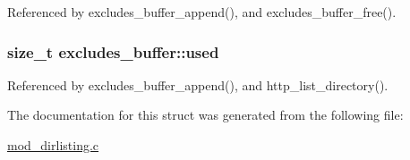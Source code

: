 Referenced by excludes\-\_\-buffer\-\_\-append(), and excludes\-\_\-buffer\-\_\-free().

\hypertarget{structexcludes__buffer_ab9bca0c4a6ef3bd0908c0f3c22632576}{
\subsubsection[{used}]{\setlength{\rightskip}{0pt plus 5cm}size\-\_\-t excludes\-\_\-buffer\-::used}}\label{structexcludes__buffer_ab9bca0c4a6ef3bd0908c0f3c22632576}


Referenced by excludes\-\_\-buffer\-\_\-append(), and http\-\_\-list\-\_\-directory().



The documentation for this struct was generated from the following file\-:\begin{DoxyCompactItemize}
\item 
\hyperlink{mod__dirlisting_8c}{mod\-\_\-dirlisting.\-c}\end{DoxyCompactItemize}

